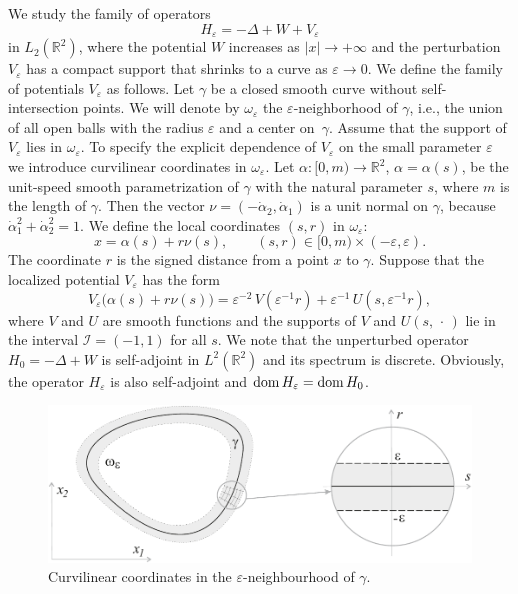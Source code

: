 \documentclass[reqno]{amsart}
\theoremstyle{plain}
\numberwithin{equation}{section}
\newcommand{\dom}{\mathop{\rm dom}}
\newcommand{\Real}{\mathbb R}
\newcommand{\eps}{\varepsilon}
\newcommand{\cI}{\mathcal{I}}
\begin{document}
We study the family of operators
\begin{equation}\label{OprHe}
H_\eps=-\Delta +W+V_\eps
\end{equation}
in $L_2(\Real^2)$, where the potential $W$ increases as $|x|\to +\infty$ and the perturbation $V_\eps$ has a compact support that shrinks to a curve as $\eps\to 0$. We define the family of potentials $V_\eps$ as follows.
Let $\gamma$ be a  closed  smooth curve without self-intersection
points. We will denote by $\omega_\eps$ the $\eps$-neighborhood of $\gamma$, i.e., the union of all open balls with the radius $\eps$ and a center on~$\gamma$.  Assume that the support of $V_\eps$ lies  in $\omega_\eps$. To specify  the explicit dependence of $V_\eps$ on  the small parameter $\eps$ we introduce  curvilinear coordinates  in $\omega_\eps$.
Let $\alpha\colon [0,m)\to \Real^2$, $\alpha=\alpha(s)$, be the unit-speed smooth parametrization of $\gamma$ with the natural parameter $s$, where $m$ is the length of $\gamma$.
Then the vector $\nu=(-\dot{\alpha}_2, \dot{\alpha}_1)$ is a unit normal on $\gamma$, because  $\dot{\alpha}_1^2+\dot{\alpha}_2^2=1$.
We define the local coordinates $(s,r)$ in $\omega_\eps$:
\begin{equation}\label{LocalTr}
    x=\alpha(s)+r\nu(s), \qquad (s,r)\in [0,m)\times (-\eps, \eps).
\end{equation}
The coordinate $r$ is the signed distance from a point $x$ to $\gamma$.
Suppose that the localized potential $V_\eps$ has the form
\begin{equation}\label{Veps}
V_\eps\big(\alpha(s)+r\nu(s)\big)=\eps^{-2}\,V\left(\eps^{-1}r\right)
+\eps^{-1}\,U\left(s,\eps^{-1}r\right),
\end{equation}
where $V$ and $U$ are smooth functions and  the supports
of $V$ and $U(s,\,\cdot\,)$ lie in the interval $\cI=(-1,1)$ for all $s$.
We note that the unperturbed operator $H_0=-\Delta +W$ is self-adjoint in $L^2(\Real^2)$ and its spectrum is discrete.  Obviously, the operator $H_\eps$ is also self-adjoint and  $\dom H_\eps=\dom H_0$.

\begin{figure}[t]
\centering
\includegraphics[scale=.6]{LocalCoords}
\caption{Curvilinear coordinates in the $\eps$-neighbourhood of $\gamma$.}
\label{FigLocalCoords}
\end{figure}
\end{document}
